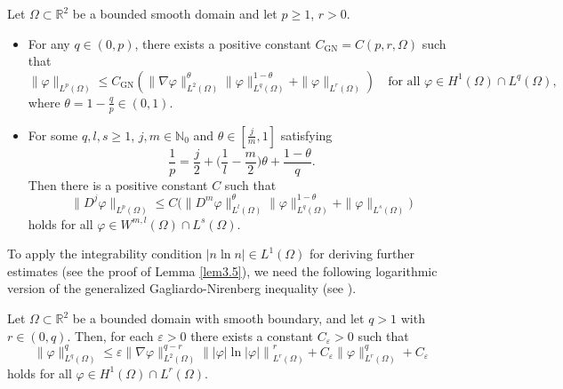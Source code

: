 \documentclass[reqno]{amsart}
\begin{document}
\begin{lemma}\label{lem2.1}
Let $ \Omega \subset \mathbb{R}^2 $ be a bounded smooth domain and let $ p \geq 1 $, 
$ r > 0 $.
\begin{itemize}
\item[(i)] For any $ q \in (0, p) $, there exists a
positive constant $ C_{\mathrm{GN}} = C(p, r, \Omega) $ such that
\begin{equation}\label{9.12-1}
\|\varphi\|_{L^p(\Omega)} \leq C_{\mathrm{GN}} ( \|\nabla \varphi\|_{L^2(\Omega)}^\theta \|\varphi\|_{L^q(\Omega)}^{1 - \theta} + \|\varphi\|_{L^r(\Omega)} )
\quad \text{for all } \varphi \in H^1(\Omega) \cap L^q(\Omega),
\end{equation}
where
\(\theta = 1 - \frac{q}{p} \in (0, 1)\).

\item[(ii)] For some $q, l, s \geq 1$, $j, m \in \mathbb{N}_0$ and 
$\theta \in [ \frac{j}{m},1]$ satisfying
\[
\frac{1}{p}=\frac{j}{2}+\Big( \frac{1}{l}-\frac{m}{2} \Big)\theta 
+ \frac{1-\theta}{q}.
\] 
Then there is a positive constant $C$ such that
\begin{equation}\label{l2.7.10.1}
\| D^j \varphi \|_{L^p(\Omega)} 
\leq C \big( \| D^m \varphi \|_{L^l(\Omega)}^\theta \| \varphi 
\|_{L^q(\Omega)}^{1-\theta} + \| \varphi \|_{L^s(\Omega)} \big)
\end{equation}
holds for all $\varphi \in W^{m,l}(\Omega) \cap L^s(\Omega)$.
\end{itemize}
\end{lemma}

To apply the integrability condition $|n \ln n|\in L^1(\Omega)$ for deriving further 
estimates (see the proof of Lemma \ref{lem3.5}), we need the following
logarithmic version of the generalized Gagliardo-Nirenberg inequality 
(see \cite{Winkler2014}).

\begin{lemma}\label{lem2.3}
Let $ \Omega \subset \mathbb{R}^2 $ be a bounded domain with smooth boundary, 
and let $ q >1 $ with $ r \in (0, q) $. Then, for each $
\varepsilon > 0 $ there exists a constant $ C_\varepsilon > 0 $ such that
\begin{equation}\label{9.12-2}
\|\varphi\|_{L^q(\Omega)}^{q} 
\leq \varepsilon \|\nabla \varphi\|_{L^2(\Omega)}^{q - r} \left\| |\varphi| 
\ln |\varphi| \right\|_{L^r(\Omega)}^{r} +
C_\varepsilon \|\varphi\|_{L^r(\Omega)}^{q} + C_\varepsilon
\end{equation}
holds for all $\varphi \in H^{1}(\Omega) \cap L^r(\Omega)$.
\end{lemma}
\end{document}
